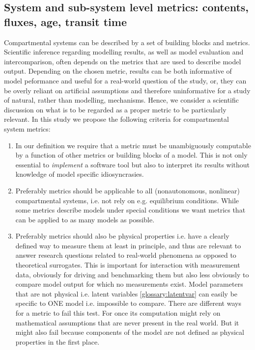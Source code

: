 \subsection{System and sub-system level metrics: contents, fluxes, age, transit time}
Compartmental systems can be described by a set of building blocks and metrics. 
Scientific inference regarding modelling results, as well as model evaluation and intercomparison, often depends on the metrics that are used to describe model output.
Depending on the chosen metric, results can be both informative of model peformance and useful for a real-world question of the study, or, they can be overly reliant on artificial assumptions and therefore uninformative for a study of natural, rather than modelling, mechanisms.
Hence, we consider a scientific discussion on what is to be regarded as a proper metric to be particularly relevant.
In this study we propose the following criteria for compartmental system metrics:
\begin{enumerate}
  \item
    \label{enum:function}
    In our definition we require that a metric must be unambiguously computable by a function of other metrics or building blocks of a model.    This is not only essential to \emph{implement} a software tool but also to interpret its results without knowledge of model specific idiosyncrasies.
  \item
    \label{enum:general}
    Preferably metrics should be applicable to all (nonautonomous, nonlinear) compartmental systems, i.e. not rely on e.g. equilibrium conditions. While some metrics describe models under special conditions we want metrics that can be applied to as many models as possible. 
  \item
    \label{enum:measurable}
  Preferably metrics should also be physical properties i.e. have a clearly
    defined way to measure them at least in principle, and thus are relevant to
    answer research questions related to real-world phenomena as opposed to
    theoretical surrogates. This is important for interaction with measurement data, obviously for driving and benchmarking them but also less obviously to compare model output for which no measurements exist.  
    Model parameters that are not physical i.e. latent variables \ref{glossary:latentvar} can easily be specific to ONE model i.e. impossible to compare. 
    There are different ways for a metric to fail this
    test. For once its computation might rely on mathematical assumptions that
    are never present in the real world. But it might also fail because
    components of the model are not defined as physical properties in the first
    place.
   
\end{enumerate}

